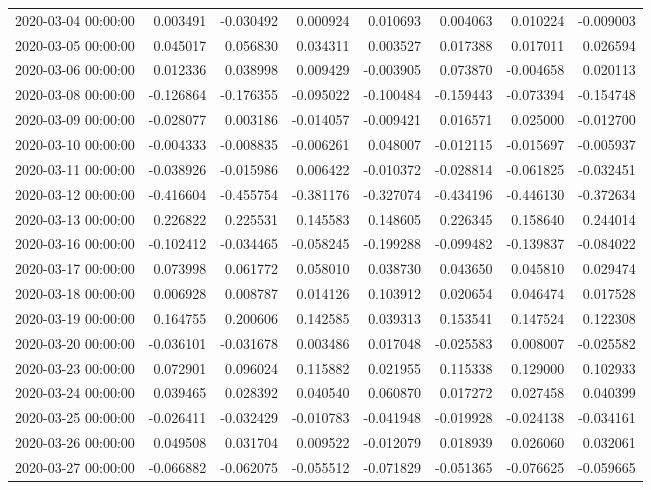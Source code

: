 \begin{tabular}{lrrrrrrr}
2020-03-04 00:00:00 & 0.003491 & -0.030492 & 0.000924 & 0.010693 & 0.004063 & 0.010224 & -0.009003 \\
2020-03-05 00:00:00 & 0.045017 & 0.056830 & 0.034311 & 0.003527 & 0.017388 & 0.017011 & 0.026594 \\
2020-03-06 00:00:00 & 0.012336 & 0.038998 & 0.009429 & -0.003905 & 0.073870 & -0.004658 & 0.020113 \\
2020-03-08 00:00:00 & -0.126864 & -0.176355 & -0.095022 & -0.100484 & -0.159443 & -0.073394 & -0.154748 \\
2020-03-09 00:00:00 & -0.028077 & 0.003186 & -0.014057 & -0.009421 & 0.016571 & 0.025000 & -0.012700 \\
2020-03-10 00:00:00 & -0.004333 & -0.008835 & -0.006261 & 0.048007 & -0.012115 & -0.015697 & -0.005937 \\
2020-03-11 00:00:00 & -0.038926 & -0.015986 & 0.006422 & -0.010372 & -0.028814 & -0.061825 & -0.032451 \\
2020-03-12 00:00:00 & -0.416604 & -0.455754 & -0.381176 & -0.327074 & -0.434196 & -0.446130 & -0.372634 \\
2020-03-13 00:00:00 & 0.226822 & 0.225531 & 0.145583 & 0.148605 & 0.226345 & 0.158640 & 0.244014 \\
2020-03-16 00:00:00 & -0.102412 & -0.034465 & -0.058245 & -0.199288 & -0.099482 & -0.139837 & -0.084022 \\
2020-03-17 00:00:00 & 0.073998 & 0.061772 & 0.058010 & 0.038730 & 0.043650 & 0.045810 & 0.029474 \\
2020-03-18 00:00:00 & 0.006928 & 0.008787 & 0.014126 & 0.103912 & 0.020654 & 0.046474 & 0.017528 \\
2020-03-19 00:00:00 & 0.164755 & 0.200606 & 0.142585 & 0.039313 & 0.153541 & 0.147524 & 0.122308 \\
2020-03-20 00:00:00 & -0.036101 & -0.031678 & 0.003486 & 0.017048 & -0.025583 & 0.008007 & -0.025582 \\
2020-03-23 00:00:00 & 0.072901 & 0.096024 & 0.115882 & 0.021955 & 0.115338 & 0.129000 & 0.102933 \\
2020-03-24 00:00:00 & 0.039465 & 0.028392 & 0.040540 & 0.060870 & 0.017272 & 0.027458 & 0.040399 \\
2020-03-25 00:00:00 & -0.026411 & -0.032429 & -0.010783 & -0.041948 & -0.019928 & -0.024138 & -0.034161 \\
2020-03-26 00:00:00 & 0.049508 & 0.031704 & 0.009522 & -0.012079 & 0.018939 & 0.026060 & 0.032061 \\
2020-03-27 00:00:00 & -0.066882 & -0.062075 & -0.055512 & -0.071829 & -0.051365 & -0.076625 & -0.059665 \\

\end{tabular}
